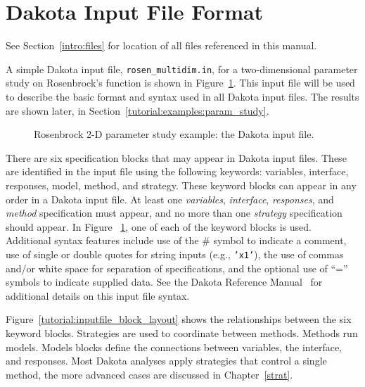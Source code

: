 \section{Dakota Input File Format}\label{tutorial:dakota}

See Section~\ref{intro:files} for location of all files referenced in this
manual.

A simple Dakota
input file, \texttt{rosen\_multidim.in},
for a two-dimensional parameter study on Rosenbrock's
function is shown in Figure~\ref{tutorial:rosenbrock_multidim}.
This input file will be used to
describe the basic format and syntax used in all Dakota input files.
The results are shown later, in Section~\ref{tutorial:examples:param_study}.

\begin{figure}[ht!]
  \centering
  \begin{bigbox}
    \begin{small}
    \end{small}
  \end{bigbox}
  \caption{Rosenbrock 2-D parameter study example: the Dakota input
    file.}
  \label{tutorial:rosenbrock_multidim}
\end{figure}

There are six specification blocks that may appear in Dakota input
files. These are identified in the input file using the following
keywords: variables, interface, responses, model, method, and strategy. These
keyword blocks can appear in any order in a Dakota input file. At
least one \emph{variables}, \emph{interface}, \emph{responses}, and
\emph{method} specification must appear, and no more than one
\emph{strategy} specification should appear. In Figure~
\ref{tutorial:rosenbrock_multidim}, one of each of the keyword blocks is
used. Additional syntax features include use of the \#
symbol to indicate a comment, use of single or double quotes for string inputs
(e.g., \texttt{'x1'}), the use of commas and/or white space for separation of
specifications, and the optional use of ``='' symbols to indicate
supplied data. See the Dakota Reference
Manual~\cite{RefMan} for additional details on this input file syntax.

Figure~\ref{tutorial:inputfile_block_layout} shows the relationships between 
the six keyword blocks. Strategies are used to coordinate between methods. 
Methods run models. Models blocks define the connections between variables, 
the interface, and responses. Most Dakota analyses apply strategies that 
control a single method, the more advanced cases are discussed in Chapter~\ref{strat}.

